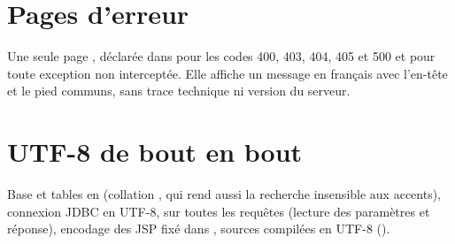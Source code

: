 \section{Pages d'erreur}

Une seule page , déclarée dans  pour les codes 400, 403, 404, 405 et 500 et pour
toute exception non interceptée. Elle affiche un message en français avec l'en-tête et le pied communs, sans
trace technique ni version du serveur.

\section{UTF-8 de bout en bout}

Base et tables en  (collation , qui rend aussi la recherche insensible aux
accents), connexion JDBC en UTF-8,  sur toutes les requêtes (lecture des paramètres et
réponse), encodage des JSP fixé dans , sources compilées en UTF-8 ().
